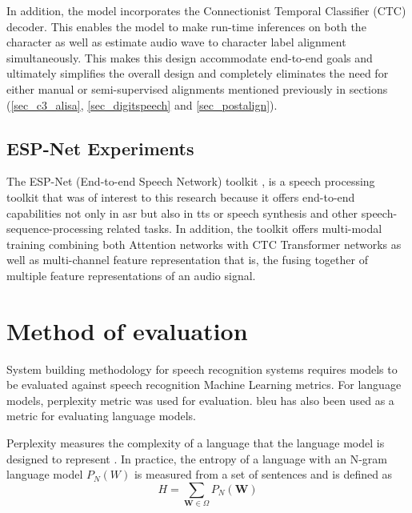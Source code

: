 In addition, the model incorporates the Connectionist Temporal Classifier (CTC) decoder. This enables the model to make run-time inferences on both the character as well as estimate audio wave to character label alignment simultaneously.  This makes this design accommodate end-to-end goals and ultimately simplifies the overall design and completely eliminates the need for either manual or semi-supervised alignments mentioned previously in sections (\ref{sec_c3_alisa}, \ref{sec_digitspeech} and \ref{sec_postalign}).

\subsection{ESP-Net Experiments}\label{c3sec_espnet}
The ESP-Net (End-to-end Speech Network) toolkit \citep{watanabe2018espnet}, is a speech processing toolkit that was of interest to this research because it offers end-to-end capabilities not only in \acrfull{asr} but also in \acrfull{tts} or speech synthesis and other speech-sequence-processing related tasks.  In addition, the toolkit offers multi-modal training combining both Attention networks \citep{vaswani2017attention} with CTC Transformer networks as well as multi-channel feature representation that is, the fusing together of multiple feature representations of an audio signal.

\section{Method of evaluation}
System building methodology \citep{nunamaker1990systems} for speech recognition systems requires models to be evaluated against speech recognition Machine Learning metrics.  For language models, perplexity metric was used for evaluation.  \acrfull{bleu}\citep{papineni2002bleu} has also been used as a metric for evaluating language models.

Perplexity measures the complexity of a language that the language model is designed to represent \citep{1976jelinekcontinuous}. In practice, the entropy of a language with an N-gram language model $P_N(W)$ is measured from a set of sentences and is defined as
\begin{equation}H=\sum_{\mathbf{W}\in\Omega}P_N(\mathbf{W})
\label{eqn_c2_lm05}
\end{equation}

